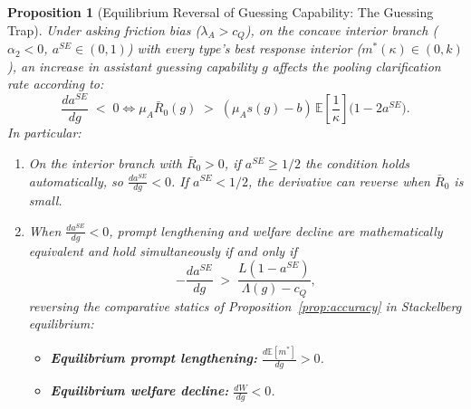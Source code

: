 \documentclass[11pt]{article}
\newtheorem{proposition}{Proposition}
\begin{document}
\begin{proposition}[Equilibrium Reversal of Guessing Capability: The Guessing Trap]
\label{prop:guessing-trap}
Under asking friction bias ($\lambda_A > c_Q$), on the concave interior branch ($\alpha_2 < 0$, $a^{SE} \in (0,1)$) with every type's best response interior ($m^*(\kappa) \in (0,k)$), an increase in assistant guessing capability $g$ affects the pooling clarification rate according to:
\[
\frac{da^{SE}}{dg} \;<\; 0 \iff \mu_A \bar R_0(g) \;>\; (\mu_A s(g) - b)\,\mathbb{E}\left[\frac{1}{\kappa}\right]\big(1 - 2a^{SE}\big).
\]
In particular:
\begin{enumerate}[label=(\roman*)]
\item On the interior branch with $\bar R_0 > 0$, if $a^{SE} \ge 1/2$ the condition holds automatically, so $\frac{da^{SE}}{dg} < 0$. If $a^{SE} < 1/2$, the derivative can reverse when $\bar R_0$ is small.
\item When $\frac{da^{SE}}{dg} < 0$, prompt lengthening and welfare decline are mathematically equivalent and hold simultaneously if and only if
\[
-\frac{da^{SE}}{dg} \;>\; \frac{L(1 - a^{SE})}{\Lambda(g) - c_Q},
\]
reversing the comparative statics of Proposition~\ref{prop:accuracy} in Stackelberg equilibrium:
\begin{itemize}[leftmargin=*]
\item \textbf{Equilibrium prompt lengthening:} $\frac{d\mathbb{E}[m^*]}{dg} > 0$.
\item \textbf{Equilibrium welfare decline:} $\frac{dW}{dg} < 0$.
\end{itemize}
\end{enumerate}
\end{proposition}
\end{document}

